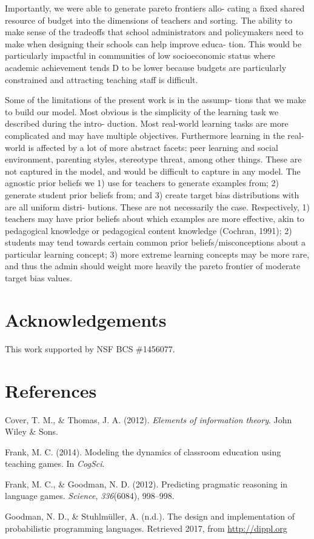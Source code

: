 \documentclass[10pt, letterpaper]{article}
\begin{document}
Importantly, we were able to generate pareto frontiers allo- cating a
fixed shared resource of budget into the dimensions of teachers and
sorting. The ability to make sense of the tradeoffs that school
administrators and policymakers need to make when designing their
schools can help improve educa- tion. This would be particularly
impactful in communities of low socioeconomic status where academic
achievement tends D to be lower because budgets are particularly
constrained and attracting teaching staff is difficult.

Some of the limitations of the present work is in the assump- tions that
we make to build our model. Most obvious is the simplicity of the
learning task we described during the intro- duction. Most real-world
learning tasks are more complicated and may have multiple objectives.
Furthermore learning in the real-world is affected by a lot of more
abstract facets: peer learning and social environment, parenting styles,
stereotype threat, among other things. These are not captured in the
model, and would be difficult to capture in any model. The agnostic
prior beliefs we 1) use for teachers to generate examples from; 2)
generate student prior beliefs from; and 3) create target bias
distributions with are all uniform distri- butions. These are not
necessarily the case. Respectively, 1) teachers may have prior beliefs
about which examples are more effective, akin to pedagogical knowledge
or pedagogical content knowledge (Cochran, 1991); 2) students may tend
towards certain common prior beliefs/misconceptions about a particular
learning concept; 3) more extreme learning concepts may be more rare,
and thus the admin should weight more heavily the pareto frontier of
moderate target bias values.

\section{Acknowledgements}\label{acknowledgements}

This work supported by NSF BCS \#1456077.

\section{References}\label{references}

\setlength{\parindent}{-0.1in} \setlength{\leftskip}{0.125in} \noindent

\hypertarget{refs}{}
\hypertarget{ref-cover2012}{}
Cover, T. M., \& Thomas, J. A. (2012). \emph{Elements of information
theory}. John Wiley \& Sons.

\hypertarget{ref-frank2014}{}
Frank, M. C. (2014). Modeling the dynamics of classroom education using
teaching games. In \emph{CogSci}.

\hypertarget{ref-frank2012}{}
Frank, M. C., \& Goodman, N. D. (2012). Predicting pragmatic reasoning
in language games. \emph{Science}, \emph{336}(6084), 998--998.

\hypertarget{ref-goodman2017}{}
Goodman, N. D., \& Stuhlmüller, A. (n.d.). The design and implementation
of probabilistic programming languages. Retrieved 2017, from
\url{http://dippl.org}
\end{document}

